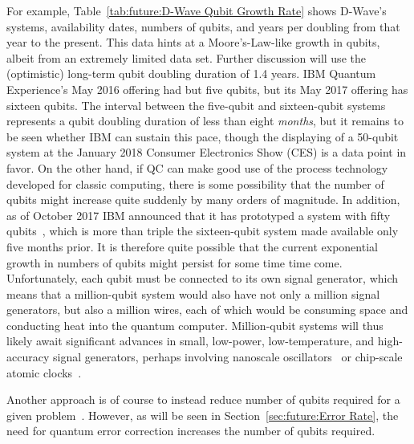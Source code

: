 For example, Table~\ref{tab:future:D-Wave Qubit Growth Rate} shows D-Wave's systems,
availability dates, numbers of qubits, and years per doubling
from that year to the present.
This data hints at a Moore's-Law-like growth in qubits, albeit from
an extremely limited data set.
Further discussion will use the (optimistic) long-term qubit
doubling duration of 1.4 years.
IBM Quantum Experience's May 2016 offering had but five qubits, but its
May 2017 offering has sixteen qubits.
The interval between the five-qubit and sixteen-qubit systems represents
a qubit doubling duration of less than eight \emph{months},
but it remains to be seen whether IBM can sustain this pace,
though the displaying of a 50-qubit system at the January 2018
Consumer Electronics Show (CES) is a data point in favor.
On the other hand, if QC can make good use of the process technology
developed for classic computing, there is some possibility that the number
of qubits might increase quite suddenly by many orders of magnitude.
In addition, as of October 2017 IBM announced that it has prototyped
a system with fifty qubits~\cite{WillKnight2017IBM50qubits}, which
is more than triple the sixteen-qubit system made available only five
months prior.
It is therefore quite possible that the current exponential growth
in numbers of qubits might persist for some time time come.
Unfortunately, each qubit must be connected to its own signal generator,
which means that a million-qubit system would also have not only a million
signal generators, but also a million wires, each of which would be
consuming space and conducting heat into the quantum computer.
Million-qubit systems will thus likely await significant advances
in small, low-power, low-temperature, and high-accuracy signal generators,
perhaps involving nanoscale
oscillators~\cite{EricCHannah2007BuckyballAtomicClock,AndriiDegeler2015BuckyballAtomicClock,KyriakosPorfyrakis2017BuckyballAtomicClock}
or chip-scale atomic
clocks~\cite{WikipediaChipScaleAtomicClock}.

Another approach is of course to instead reduce number of qubits required for a
given problem~\cite{SergeyBravyi2017-QC-SimulateFermionicHamiltonians}.
However, as will be seen in Section~\ref{sec:future:Error Rate}, the need for
quantum error correction increases the number of qubits required.
\fi


